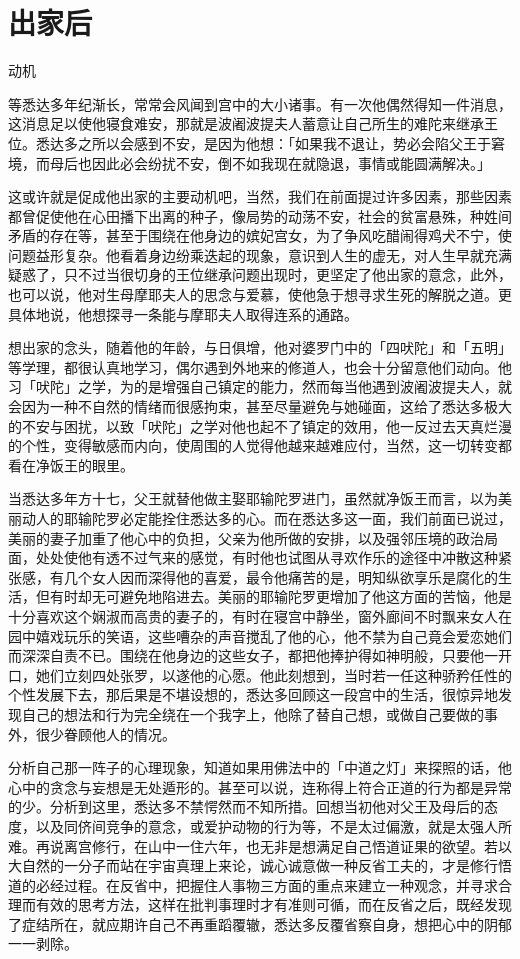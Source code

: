 \documentclass[12pt,twoside,openany]{book}
\begin{document}
\section{出家后}\label{sec1.13}

动机

等悉达多年纪渐长，常常会风闻到宫中的大小诸事。有一次他偶然得知一件消息，这消息足以使他寝食难安，那就是波阇波提夫人蓄意让自己所生的难陀来继承王位。悉达多之所以会感到不安，是因为他想：「如果我不退让，势必会陷父王于窘境，而母后也因此必会纷扰不安，倒不如我现在就隐退，事情或能圆满解决。」

这或许就是促成他出家的主要动机吧，当然，我们在前面提过许多因素，那些因素都曾促使他在心田播下出离的种子，像局势的动荡不安，社会的贫富悬殊，种姓间矛盾的存在等，甚至于围绕在他身边的嫔妃宫女，为了争风吃醋闹得鸡犬不宁，使问题益形复杂。他看着身边纷乘迭起的现象，意识到人生的虚无，对人生早就充满疑惑了，只不过当很切身的王位继承问题出现时，更坚定了他出家的意念，此外，也可以说，他对生母摩耶夫人的思念与爱慕，使他急于想寻求生死的解脱之道。更具体地说，他想探寻一条能与摩耶夫人取得连系的通路。

想出家的念头，随着他的年龄，与日俱增，他对婆罗门中的「四吠陀」和「五明」等学理，都很认真地学习，偶尔遇到外地来的修道人，也会十分留意他们动向。他习「吠陀」之学，为的是增强自己镇定的能力，然而每当他遇到波阇波提夫人，就会因为一种不自然的情绪而很感拘束，甚至尽量避免与她碰面，这给了悉达多极大的不安与困扰，以致「吠陀」之学对他也起不了镇定的效用，他一反过去天真烂漫的个性，变得敏感而内向，使周围的人觉得他越来越难应付，当然，这一切转变都看在净饭王的眼里。

当悉达多年方十七，父王就替他做主娶耶输陀罗进门，虽然就净饭王而言，以为美丽动人的耶输陀罗必定能拴住悉达多的心。而在悉达多这一面，我们前面已说过，美丽的妻子加重了他心中的负担，父亲为他所做的安排，以及强邻压境的政治局面，处处使他有透不过气来的感觉，有时他也试图从寻欢作乐的途径中冲散这种紧张感，有几个女人因而深得他的喜爱，最令他痛苦的是，明知纵欲享乐是腐化的生活，但有时却无可避免地陷进去。美丽的耶输陀罗更增加了他这方面的苦恼，他是十分喜欢这个娴淑而高贵的妻子的，有时在寝宫中静坐，窗外廊间不时飘来女人在园中嬉戏玩乐的笑语，这些嘈杂的声音搅乱了他的心，他不禁为自己竟会爱恋她们而深深自责不已。围绕在他身边的这些女子，都把他捧护得如神明般，只要他一开口，她们立刻四处张罗，以遂他的心愿。他此刻想到，当时若一任这种骄矜任性的个性发展下去，那后果是不堪设想的，悉达多回顾这一段宫中的生活，很惊异地发现自己的想法和行为完全绕在一个我字上，他除了替自己想，或做自己要做的事外，很少眷顾他人的情况。

分析自己那一阵子的心理现象，知道如果用佛法中的「中道之灯」来探照的话，他心中的贪念与妄想是无处遁形的。甚至可以说，连称得上符合正道的行为都是异常的少。分析到这里，悉达多不禁愕然而不知所措。回想当初他对父王及母后的态度，以及同侪间竞争的意念，或爱护动物的行为等，不是太过偏激，就是太强人所难。再说离宫修行，在山中一住六年，也无非是想满足自己悟道证果的欲望。若以大自然的一分子而站在宇宙真理上来论，诚心诚意做一种反省工夫的，才是修行悟道的必经过程。在反省中，把握住人事物三方面的重点来建立一种观念，并寻求合理而有效的思考方法，这样在批判事理时才有准则可循，而在反省之后，既经发现了症结所在，就应期许自己不再重蹈覆辙，悉达多反覆省察自身，想把心中的阴郁一一剥除。
\end{document}
